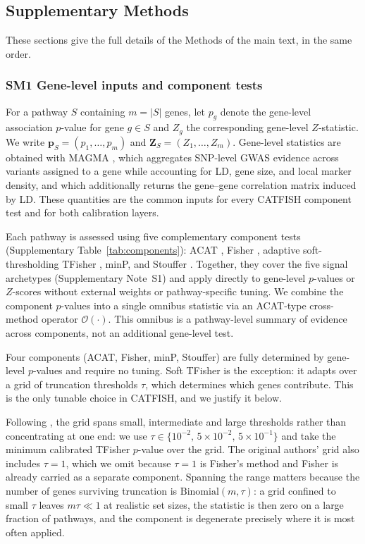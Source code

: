 
\subsection*{Supplementary Methods}

These sections give the full details of the Methods of the main text, in the same order.

\subsubsection*{SM1 Gene-level inputs and component tests}

For a pathway $S$ containing $m=|S|$ genes, let $p_g$ denote the gene-level
association $p$-value for gene $g\in S$ and $Z_g$ the corresponding gene-level $Z$-statistic. We write $\mathbf{p}_S=(p_1,\dots,p_m)$ and $\mathbf{Z}_S=(Z_1,\dots,Z_m)$. Gene-level statistics are obtained with MAGMA \citep{deLeeuw2015}, which aggregates SNP-level GWAS evidence across variants assigned to a gene while accounting for LD, gene size, and local marker density, and which additionally returns the gene--gene correlation matrix induced by LD. These quantities are the common inputs for every CATFISH component test and for both calibration layers.

Each pathway is assessed using five complementary component tests (Supplementary Table~\ref{tab:components}): ACAT \citep{Liu2019ACATV,Liu2020ACAT}, Fisher \citep{Fisher1932}, adaptive soft-thresholding TFisher \citep{Zhang2020TFisher}, minP, and Stouffer \citep{Stouffer1949}. Together, they cover the five signal archetypes (Supplementary Note~S1) and apply directly to gene-level $p$-values or $Z$-scores without external weights or pathway-specific tuning. We combine the component $p$-values into a single omnibus statistic via an ACAT-type cross-method operator $\mathcal{O}(\cdot)$. This omnibus is a pathway-level summary of evidence across components, not an additional gene-level test.

Four components (ACAT, Fisher, minP, Stouffer) are fully determined by gene-level $p$-values and require no tuning. Soft TFisher is the exception: it adapts over a grid of truncation thresholds $\tau$, which determines which genes contribute. This is the only tunable choice in CATFISH, and we justify it below.

Following \citet{Zhang2020TFisher}, the grid spans small, intermediate and large thresholds rather than concentrating at one end: we use \(\tau\in\{10^{-2},\,5\times10^{-2},\,5\times10^{-1}\}\) and take the minimum calibrated TFisher \(p\)-value over the grid. The original authors' grid also includes \(\tau=1\), which we omit because \(\tau=1\) is Fisher's method and Fisher is already carried as a separate component. Spanning the range matters because the number of genes surviving truncation is \(\mathrm{Binomial}(m,\tau)\): a grid confined to small \(\tau\) leaves \(m\tau\ll1\) at realistic set sizes, the statistic is then zero on a large fraction of pathways, and the component is degenerate precisely where it is most often applied.

